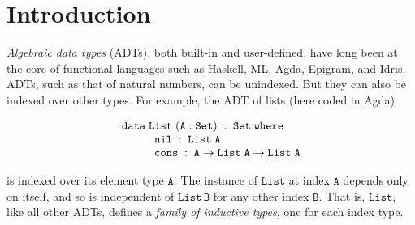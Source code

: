 \documentclass{lmcs}
\theoremstyle{plain}\newtheorem{satz}[thm]{Satz}
\begin{document}
\section{Introduction}\label{sec:intro}

{\em Algebraic data types} (ADTs), both built-in and user-defined,
have long been at the core of functional languages such as Haskell,
ML, Agda, Epigram, and Idris. ADTs, such as that of natural numbers,
can be unindexed. But they can also be indexed over other types. For
example, the ADT of lists (here coded in Agda)

{\small
\[\begin{array}{l}
\mathtt{data\; List \;(A : Set)\;:\;Set\;where}\\
\hspace*{0.4in}\mathtt{nil\;:\; List\;A}\\
\hspace*{0.4in}\mathtt{cons\;:\;A \rightarrow List\;A \rightarrow List\;A}
\end{array}\]}

\noindent
is indexed over its element type $\mathtt{A}$.  The instance of
$\mathtt{List}$ at index $\mathtt{A}$ depends only on itself, and so is
independent of $\mathtt{List\,B}$ for any other index $\mathtt{B}$.
That is, $\mathtt{List}$, like all other ADTs, defines a {\em family
  of inductive types}, one for each index type.
\end{document}

